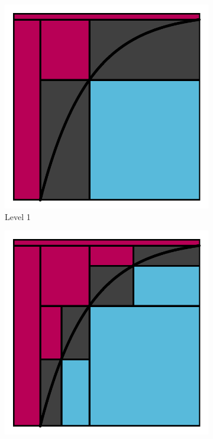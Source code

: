 \begin{figure}
\begin{subfigure}[b]{0.21\textwidth}
    \includegraphics[width=\textwidth, trim={\tw, \tw, \tw, \tw}, clip]{./figures/splitting_lvl1.pdf}
    \caption{Level 1}
  \end{subfigure}
  \hfill
  \begin{subfigure}[b]{0.21\textwidth}
    \includegraphics[width=\textwidth, trim={\tw, \tw, \tw, \tw}, clip]{./figures/splitting_lvl2.pdf}

\end{subfigure}
\end{figure}
